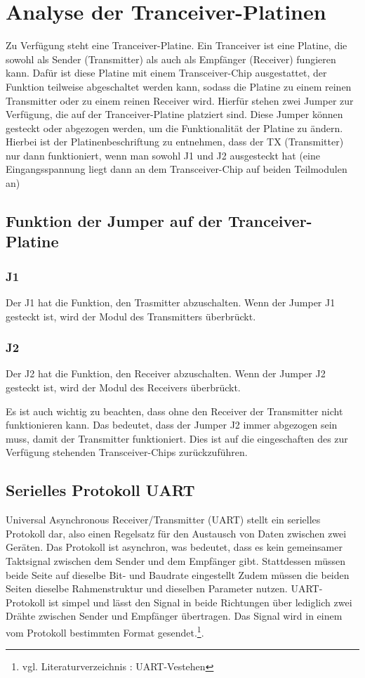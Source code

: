 \section{Analyse der Tranceiver-Platinen}
Zu Verfügung steht eine Tranceiver-Platine. Ein Tranceiver ist eine Platine, die sowohl als Sender (Transmitter) als auch als Empfänger (Receiver) fungieren kann. Dafür ist diese Platine mit einem Transceiver-Chip ausgestattet, der Funktion teilweise abgeschaltet werden kann, sodass die Platine zu einem reinen Transmitter oder zu einem reinen Receiver wird.  
Hierfür stehen zwei Jumper zur Verfügung, die auf der Tranceiver-Platine platziert sind. Diese Jumper können gesteckt oder abgezogen werden, um die Funktionalität der Platine zu ändern. Hierbei ist der Platinenbeschriftung zu entnehmen, dass der TX (Transmitter) nur dann funktioniert, wenn man sowohl J1 und J2 ausgesteckt hat (eine Eingangsspannung liegt dann an dem Transceiver-Chip auf beiden Teilmodulen an)
\subsection{Funktion der Jumper auf der Tranceiver-Platine}
\subsubsection{J1}
Der J1 hat die Funktion, den Trasmitter abzuschalten. Wenn der Jumper J1 gesteckt ist, wird der Modul des Transmitters überbrückt.
\subsubsection{J2}
Der J2 hat die Funktion, den Receiver abzuschalten. Wenn der Jumper J2 gesteckt ist, wird der Modul des Receivers überbrückt.

Es ist auch wichtig zu beachten, dass ohne den Receiver der Transmitter nicht funktionieren kann. Das bedeutet, dass der Jumper J2 immer abgezogen sein muss, damit der Transmitter funktioniert. Dies ist auf die eingeschaften des zur Verfügung stehenden Transceiver-Chips zurückzuführen.

\subsection{Serielles Protokoll UART}
Universal Asynchronous Receiver/Transmitter (UART) stellt ein serielles Protokoll dar, also einen Regelsatz für den Austausch von Daten zwischen zwei Geräten. Das Protokoll ist asynchron, was bedeutet, dass es kein gemeinsamer Taktsignal zwischen dem Sender und dem Empfänger gibt. Stattdessen müssen beide Seite auf dieselbe Bit- und Baudrate eingestellt
Zudem müssen die beiden Seiten dieselbe Rahmenstruktur und dieselben Parameter nutzen. UART-Protokoll ist simpel und lässt den Signal in beide Richtungen über lediglich zwei Drähte zwischen Sender und Empfänger übertragen. Das Signal wird in einem vom Protokoll bestimmten Format gesendet.\footnote{vgl. Literaturverzeichnis \cite{UART-Verstehen}: UART-Vestehen}. 

